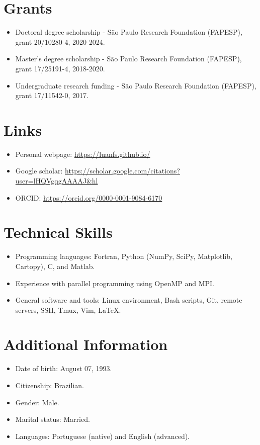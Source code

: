 \documentclass[letterpaper,11pt]{article}
\begin{document}
%
\section{Grants}
\begin{itemize}
	\item Doctoral degree scholarship  - São Paulo Research Foundation (FAPESP),  grant 20/10280-4, 2020-2024.		
	\item Master's degree scholarship   - São Paulo Research Foundation (FAPESP),  grant 17/25191-4, 2018-2020.
	\item Undergraduate research funding  - São Paulo Research Foundation (FAPESP), grant 17/11542-0, 2017.
\end{itemize}

 
%
\section{Links}
\begin{itemize}
	\item Personal webpage:  \href{https://luanfs.github.io/}{https://luanfs.github.io/}
	\item Google scholar: \href{https://scholar.google.com/citations?user=lHQVgqgAAAAJ&hl}{https://scholar.google.com/citations?user=lHQVgqgAAAAJ\&hl}
	\item ORCID:  \href{https://orcid.org/0000-0001-9084-6170}{https://orcid.org/0000-0001-9084-6170}
\end{itemize}

 
%
\section{Technical Skills}
\begin{itemize}
	\item Programming languages: Fortran, Python (NumPy, SciPy, Matplotlib, Cartopy), C, and Matlab.
	\item Experience with parallel programming using OpenMP and MPI.
	\item General software and tools: Linux environment, Bash scripts, Git, remote servers, SSH, Tmux, Vim, \LaTeX.
\end{itemize}


\section{Additional Information}
\begin{itemize}
	\item Date of birth: August 07, 1993.
	\item Citizenship: Brazilian.
	\item Gender: Male.
	\item Marital status: Married. %
	\item Languages: Portuguese (native) and English (advanced).
\end{itemize}




\end{document}
